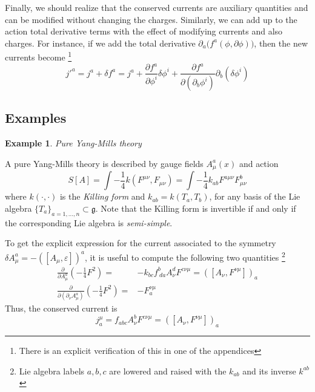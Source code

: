 \documentclass[a4paper,12pt]{article}
\newtheorem{exm}{Example}
\numberwithin{equation}{section}
\numberwithin{thm}{section}
\numberwithin{exm}{section}
\newcommand{\p}{\partial}
\newcommand{\<}{{\langle}}
\renewcommand{\>}{{\rangle}}
\renewcommand{\d}{{\delta}}
\begin{document}
Finally, we should realize that the conserved currents are auxiliary quantities and can be modified without changing the charges. Similarly, we can add up to the action total derivative terms with the effect of modifying currents and also charges. For instance, if we add the total derivative $\p_a\Big(f^a(\phi,\p \phi)\Big)$, then the new currents become%
\footnote{There is an explicit verification of this in one of the appendices}
	\begin{equation}
	j'^a = j^a + \d f^a = j^a + \frac{\p f^a}{\p \phi^i}\d\phi^i + \frac{\p f^a}{\p(\p_b \phi^i)}\p_b(\d\phi^i)
	\end{equation}

\subsection{Examples}

\begin{exm} Pure Yang-Mills theory \end{exm}
A pure Yang-Mills theory is described by gauge fields $A_\mu^a(x)$ and action 
	\begin{equation}
	S[A]=\int -\frac{1}{4}k(F^{\mu\nu},F_{\mu\nu})=\int -\frac{1}{4}k_{ab}F^{a\mu\nu}F^b_{\mu\nu}
	\end{equation}
where $k(\cdot,\cdot)$ is the {\it Killing form} and $k_{ab}=k(T_a,T_b)$, for any basis of the Lie algebra $\{T_a\}_{a=1,\ldots,n}\subset \mathfrak{g}$. Note that the Killing form is invertible if and only if the corresponding Lie algebra is {\it semi-simple}.%

To get the explicit expression for the current associated to the symmetry $\delta A^a_\mu=-([A_\mu,\varepsilon])^a$, it is useful to compute the following two quantities%
\footnote{Lie algebra labels $a,b,c$ are lowered and raised with the $k_{ab}$ and its inverse $k^{ab}$}
	\begin{align}
	\frac{\p}{\p A^a_\mu}\left(-\frac{1}{4}F^2\right)=&-k_{bc}f^b_{\ da}A^d_\nu F^{c\nu\mu}=\left([A_\nu,F^{\nu\mu}]\right)_a\\
	\frac{\p}{\p(\p_\nu A^a_\mu)}\left(-\frac{1}{4}F^2\right)=&-F^{\nu\mu}_a
	\end{align}
Thus, the conserved current is
	\begin{equation}
	j^\mu_a=f_{abc}A_\nu^b F^{c\nu\mu}=([A_\nu,F^{\nu\mu}])_a
	\end{equation}
\end{document}
